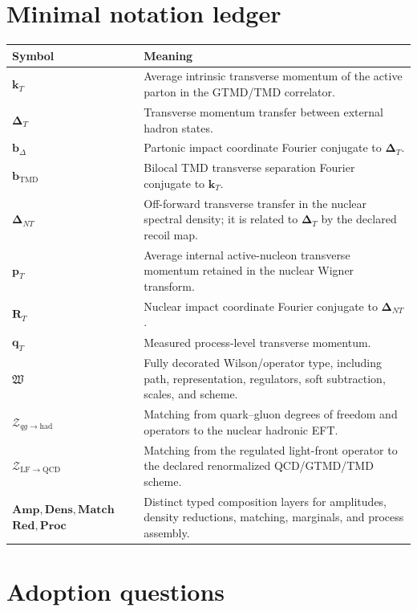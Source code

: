 \documentclass[11pt]{article}
\newcommand{\kT}{\bm{k}_{T}}
\newcommand{\pT}{\bm{p}_{T}}
\newcommand{\qT}{\bm{q}_{T}}
\newcommand{\DT}{\bm{\Delta}_{T}}
\newcommand{\DNT}{\bm{\Delta}_{N T}}
\newcommand{\bD}{\bm{b}_{\Delta}}
\newcommand{\bM}{\bm{b}_{\mathrm{TMD}}}
\newcommand{\RT}{\bm{R}_{T}}
\newcommand{\LF}{\mathrm{LF}}
\newcommand{\Amp}{\mathbf{Amp}}
\newcommand{\Dens}{\mathbf{Dens}}
\newcommand{\Match}{\mathbf{Match}}
\newcommand{\Red}{\mathbf{Red}}
\newcommand{\Proc}{\mathbf{Proc}}
\newcommand{\cZ}{\mathcal Z}
\begin{document}
\section{Minimal notation ledger}
\label{app:notation}

\begin{longtable}{L{0.20\textwidth}L{0.70\textwidth}}
\toprule
Symbol & Meaning\\
\midrule
\endhead
\(\kT\) & Average intrinsic transverse momentum of the active parton in the
GTMD/TMD correlator.\\
\(\DT\) & Transverse momentum transfer between external hadron states.\\
\(\bD\) & Partonic impact coordinate Fourier conjugate to \(\DT\).\\
\(\bM\) & Bilocal TMD transverse separation Fourier conjugate to \(\kT\).\\
\(\DNT\) & Off-forward transverse transfer in the nuclear spectral density; it is related to \(\DT\) by the declared recoil map.\\
\(\pT\) & Average internal active-nucleon transverse momentum retained in the nuclear Wigner transform.\\
\(\RT\) & Nuclear impact coordinate Fourier conjugate to \(\DNT\).\\
\(\qT\) & Measured process-level transverse momentum.\\
\(\mathfrak W\) & Fully decorated Wilson/operator type, including path,
representation, regulators, soft subtraction, scales, and scheme.\\
\(\cZ_{qg\to\mathrm{had}}\) & Matching from quark--gluon degrees of freedom
and operators to the nuclear hadronic EFT.\\
\(\cZ_{\LF\to\mathrm{QCD}}\) & Matching from the regulated light-front
operator to the declared renormalized QCD/GTMD/TMD scheme.\\
\(\Amp,\Dens,\Match\)\newline\(\Red,\Proc\) & Distinct typed composition layers for
amplitudes, density reductions, matching, marginals, and process assembly.\\
\bottomrule
\end{longtable}

\section{Adoption questions}
\label{app:questions}
\end{document}
